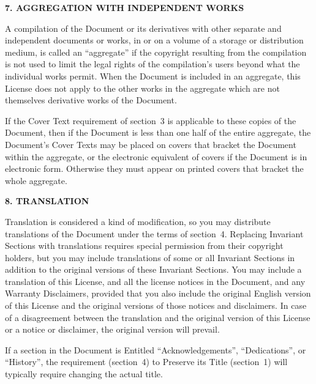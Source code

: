 \begin{center}
{\Large\bf 7. AGGREGATION WITH INDEPENDENT WORKS\par}
{}
\end{center}


A compilation of the Document or its derivatives with other separate
and independent documents or works, in or on a volume of a storage or
distribution medium, is called an ``aggregate'' if the copyright
resulting from the compilation is not used to limit the legal rights
of the compilation's users beyond what the individual works permit.
When the Document is included in an aggregate, this License does not
apply to the other works in the aggregate which are not themselves
derivative works of the Document.

If the Cover Text requirement of section~3 is applicable to these
copies of the Document, then if the Document is less than one half of
the entire aggregate, the Document's Cover Texts may be placed on
covers that bracket the Document within the aggregate, or the
electronic equivalent of covers if the Document is in electronic form.
Otherwise they must appear on printed covers that bracket the whole
aggregate.


\begin{center}
{\Large\bf 8. TRANSLATION\par}
{}
\end{center}


Translation is considered a kind of modification, so you may
distribute translations of the Document under the terms of section~4.
Replacing Invariant Sections with translations requires special
permission from their copyright holders, but you may include
translations of some or all Invariant Sections in addition to the
original versions of these Invariant Sections.  You may include a
translation of this License, and all the license notices in the
Document, and any Warranty Disclaimers, provided that you also include
the original English version of this License and the original versions
of those notices and disclaimers.  In case of a disagreement between
the translation and the original version of this License or a notice
or disclaimer, the original version will prevail.

If a section in the Document is Entitled ``Acknowledgements'',
``Dedications'', or ``History'', the requirement (section~4) to Preserve
its Title (section~1) will typically require changing the actual
title.


